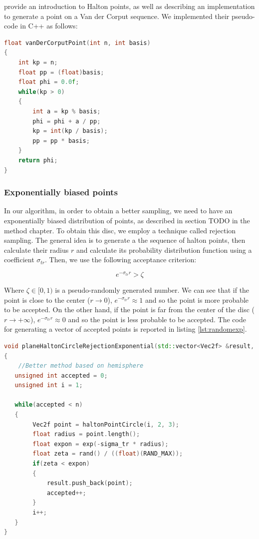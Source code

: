 \cite{journals/jgtools/WongLH97} provide an introduction to Halton points, as well as describing an implementation to generate a point on a Van der Corput sequence. We implemented their pseudo-code in C++ as follows:

\begin{lstlisting}[language=C++,label=lst:vandercorput,caption={Generating the p-adic Van der Corput point.}]
float vanDerCorputPoint(int n, int basis)
{
    int kp = n;
    float pp = (float)basis;
    float phi = 0.0f;
    while(kp > 0)
    {
        int a = kp % basis;
        phi = phi + a / pp;
        kp = int(kp / basis);
        pp = pp * basis;
    }
    return phi;
}
\end{lstlisting}

\subsubsection{Exponentially biased points}
In our algorithm, in order to obtain a better sampling, we need to have an exponentially biased distribution of points, as described in section TODO in the method chapter. To obtain this disc, we employ a technique called rejection sampling. The general idea is to generate a the sequence of halton points, then calculate their radius $r$ and calculate its probability distribution function using a coefficient $\sigma_{tr}$. Then, we use the following acceptance criterion:

$$
e^{-\sigma_{tr} r} > \zeta
$$

Where $\zeta \in [0,1)$ is a pseudo-randomly generated number. We can see that if the point is close to the center ($r \rightarrow 0$), $e^{-\sigma_{tr} r} \approx 1$ and so the point is more probable to be accepted. On the other hand, if the point is far from the center of the disc ($r \rightarrow +\infty$), $e^{-\sigma_{tr} r} \approx 0$ and so the point is less probable to be accepted. The code for generating a vector of accepted points is reported in listing \ref{lst:randomexp}.

\begin{lstlisting}[language=C++,label=lst:randomexp,caption={Generation by rejection of a exponentially distributed disc.}]
void planeHaltonCircleRejectionExponential(std::vector<Vec2f> &result, int n, float sigma_tr)
{
    //Better method based on hemisphere
   unsigned int accepted = 0;
   unsigned int i = 1;
	
   while(accepted < n)
   {
        Vec2f point = haltonPointCircle(i, 2, 3);
        float radius = point.length();
        float expon = exp(-sigma_tr * radius);
        float zeta = rand() / ((float)(RAND_MAX));
        if(zeta < expon)
        {
            result.push_back(point);
            accepted++;
        }
        i++;
   }
}
\end{lstlisting}

